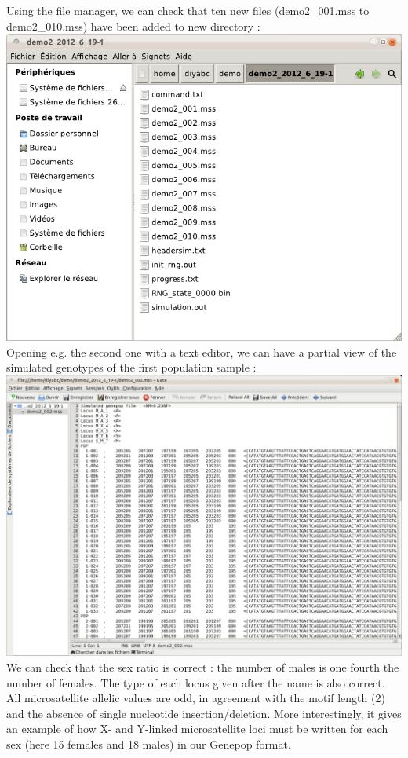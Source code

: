 Using the file manager, we can check that ten new files (\textsf{demo2\_001.mss} to \textsf{demo2\_010.mss}) have been added to new directory :\\

\includegraphics[scale=0.33]{gui_pictures/Capture-DIYABC-87.png} \\

Opening e.g. the second one with a text editor, we can have a partial view of the simulated genotypes of the first population sample : \\

\includegraphics[scale=0.33]{gui_pictures/Capture-DIYABC-88.png} \\

We can check that the sex ratio is correct : the number of males is one fourth the number of females. The type of each locus given after the name is also correct. All microsatellite allelic values are odd, in agreement with the motif length (2) and the absence of single nucleotide insertion/deletion. More interestingly, it gives an example of how X- and Y-linked microsatellite loci must be written for each sex (here 15 females and 18 males) in our Genepop format. 


